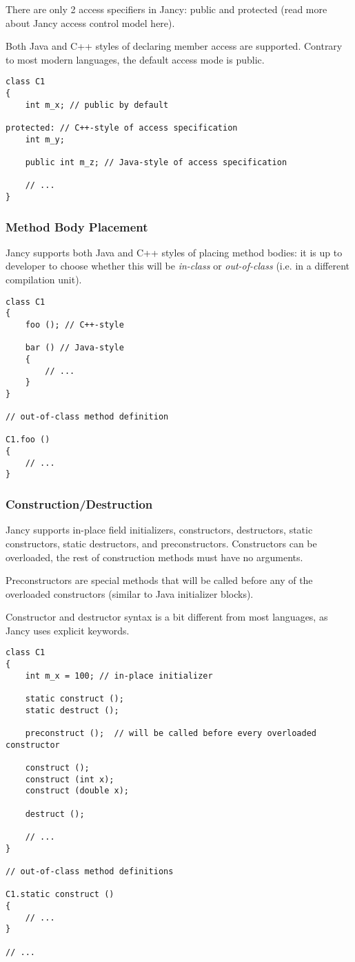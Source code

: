 \documentclass[oneside]{book}
\begin{document}
There are only 2 access specifiers in Jancy: public and protected (read more about Jancy access control model here).

Both Java and C++ styles of declaring member access are supported. Contrary to most modern languages, the default access mode is public.

\begin{lstlisting}
class C1
{
    int m_x; // public by default

protected: // C++-style of access specification
    int m_y;

    public int m_z; // Java-style of access specification

    // ...
}
\end{lstlisting}

\subsubsection{Method Body Placement}

Jancy supports both Java and C++ styles of placing method bodies: it is up to developer to choose whether this will be \emph{in-class} or \emph{out-of-class} (i.e. in a different compilation unit).

\begin{lstlisting}
class C1 
{
    foo (); // C++-style

    bar () // Java-style
    {
        // ...
    }
}

// out-of-class method definition

C1.foo ()
{
    // ...
}
\end{lstlisting}

\subsubsection{Construction/Destruction}

Jancy supports in-place field initializers, constructors, destructors, static constructors, static destructors, and preconstructors. Constructors can be overloaded, the rest of construction methods must have no arguments.

Preconstructors are special methods that will be called before any of the overloaded constructors (similar to Java initializer blocks).

Constructor and destructor syntax is a bit different from most languages, as Jancy uses explicit keywords.

\begin{lstlisting}
class C1 
{
    int m_x = 100; // in-place initializer

    static construct ();
    static destruct ();

    preconstruct ();  // will be called before every overloaded constructor

    construct ();
    construct (int x);
    construct (double x);

    destruct ();

    // ...
}

// out-of-class method definitions

C1.static construct ()
{
    // ...
}

// ...
\end{lstlisting}
\end{document}
